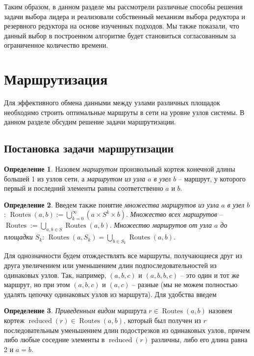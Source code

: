 \documentclass{article}
\theoremstyle{plain}
\theoremstyle{plain}
\theoremstyle{plain}
\theoremstyle{plain}
\theoremstyle{definition}
\newtheorem{definition}{Определение}[section]
\theoremstyle{remark}
\theoremstyle{plain}
\DeclareMathOperator*{\routes}{Routes}
\DeclareMathOperator*{\reduced}{reduced}
\begin{document}
Таким образом, в данном разделе мы рассмотрели различные способы решения задачи выбора лидера и реализовали собственный механизм выбора редуктора и резервного редуктора на основе изученных подходов. Мы также показали, что данный выбор в построенном алгоритме будет становиться согласованным за ограниченное количество времени.

\section{Маршрутизация}
\label{RoutingSection}

Для эффективного обмена данными между узлами различных площадок необходимо строить оптимальные маршруты в сети на уровне узлов системы. В данном разделе обсудим решение задачи маршрутизации.

\subsection{Постановка задачи маршрутизации}

\begin{definition}
    Назовем \textit{маршрутом} произвольный кортеж конечной длины большей 1 из узлов сети, а \textit{маршрутом из узла $a$ в узел $b$} -- маршрут, у которого первый и последний элементы равны соответственно $a$ и $b$.
\end{definition}

\begin{definition}
    Введем также понятие \textit{множества маршрутов из узла $a$ в узел $b$}: $\routes(a, b) := \displaystyle \bigcup_{k = 0}^{\infty} ({a} \times S^k \times {b})$. \textit{Множество всех маршрутов} -- $\routes := \displaystyle \bigcup_{a, b \in S} \routes(a, b)$. \textit{Множество маршрутов от узла $a$ до площадки $S_k$}: $\routes(a, S_k) = \displaystyle \bigcup_{b \in S_k} \routes(a, b)$.
\end{definition}

Для однозначности будем отождествлять все маршруты, получающиеся друг из друга увеличением или уменьшением длин подпоследовательностей из одинаковых узлов. Так, например, $(a, b, c)$ и $(a, b, b, c)$ -- это один и тот же маршрут, но при этом $(a, b, c)$ и $(a, c)$ -- разные (мы не можем полностью удалять цепочку одинаковых узлов из маршрута). Для удобства введем

\begin{definition}
\label{RouteReducedView}
    \textit{Приведенным видом} маршрута $r \in \routes(a, b)$ назовем кортеж $\reduced(r) \in \routes(a, b)$, который был получен из $r$ последовательным уменьшением длин подострезков из одинаковых узлов, причем либо любые соседние элементы в $\reduced(r)$ различны, либо его длина равна 2 и $a = b$.
\end{definition}
\end{document}
